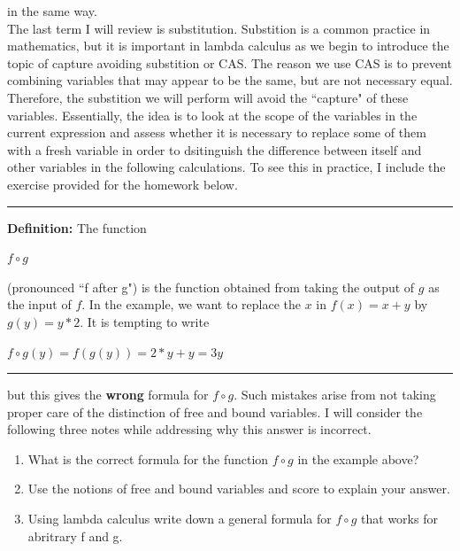 \documentclass{article}
\theoremstyle{theorem}
\theoremstyle{definition}
\theoremstyle{remark}
\begin{document}
in the same way. \\ \indent The last term I will review is substitution. Substition is a common practice in mathematics, but it is important in lambda calculus as we begin to introduce the topic of capture avoiding substition or CAS. The reason we use CAS is to
prevent combining variables that may appear to be the same, but are not necessary equal. Therefore, the substition we will perform will avoid the ``capture" of these variables. Essentially, the idea is to look at the scope of the variables in the 
current expression and assess whether it is necessary to replace some of them with a fresh variable in order to dsitinguish the difference between itself and other variables in the following calculations. To see this in practice, I include the 
exercise provided for the homework below. \\

\noindent
  {\color{gray} \rule{\linewidth}{0.05mm}}
\textbf{Definition: } The function 
\begin{center}
  $f \circ g$
\end{center}
(pronounced ``f after g") is the function obtained from taking the output of $g$ as the input of $f$. In the example, we want to replace the $x$ in $f(x) = x + y$ by 
$g(y) = y * 2$. It is tempting to write
\begin{center}
  $f \circ g(y) = f(g(y)) = 2 * y + y = 3y$
\end{center}
\noindent
  {\color{gray} \rule{\linewidth}{0.05mm}}
but this gives the \textbf{wrong} formula for $f \circ g$. Such mistakes arise from not taking proper care of the distinction of free and bound variables. I will consider the following three notes while addressing why this answer is incorrect. 
\begin{enumerate}
  \item What is the correct formula for the function $f \circ g$ in the example above?
  \item Use the notions of free and bound variables and score to explain your answer.
  \item Using lambda calculus write down a general formula for $f \circ g$ that works for abritrary f and g.
\end {enumerate}
\end{document}
